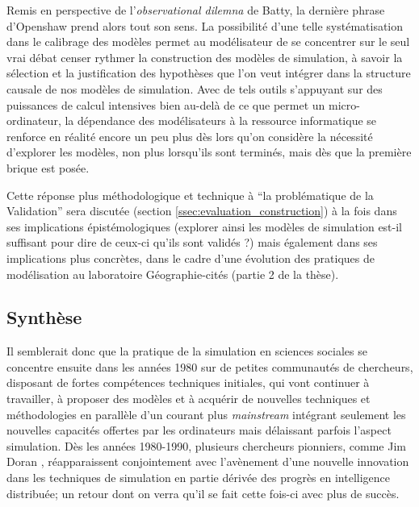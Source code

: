 Remis en perspective de l'\textit{observational dilemna} de Batty, la dernière phrase d'Openshaw prend alors tout son sens. La possibilité d'une telle systématisation dans le calibrage des modèles permet au modélisateur de se concentrer sur le seul vrai débat censer rythmer la construction des modèles de simulation, à savoir la sélection et la justification des hypothèses que l'on veut intégrer dans la structure causale de nos modèles de simulation. Avec de tels outils s'appuyant sur des puissances de calcul intensives bien au-delà de ce que permet un micro-ordinateur, la dépendance des modélisateurs à la ressource informatique se renforce en réalité encore un peu plus dès lors qu'on considère la nécessité d'explorer les modèles, non plus lorsqu'ils sont terminés, mais dès que la première brique est posée.

Cette réponse plus méthodologique et technique à \enquote{la problématique de la Validation} sera discutée (section \ref{ssec:evaluation_construction}) à la fois dans ses implications épistémologiques (explorer ainsi les modèles de simulation est-il suffisant pour dire de ceux-ci qu'ils sont validés ?) mais également dans ses implications plus concrètes, dans le cadre d'une évolution des pratiques de modélisation au laboratoire Géographie-cités (partie 2 de la thèse).

\subsection{Synthèse}


Il semblerait donc que la pratique de la simulation en sciences sociales se concentre ensuite dans les années 1980 sur de petites communautés de chercheurs, disposant de fortes compétences techniques initiales, qui vont continuer à travailler, à proposer des modèles et à acquérir de nouvelles techniques et méthodologies en parallèle d'un courant plus \textit{mainstream} intégrant seulement les nouvelles capacités offertes par les ordinateurs mais délaissant parfois l'aspect simulation. Dès les années 1980-1990, plusieurs chercheurs pionniers, comme Jim Doran \autocites{Doran1982, Doran1985, Doran1986, Doran1986b}, réapparaissent conjointement avec l’avènement d'une nouvelle innovation dans les techniques de simulation en partie dérivée des progrès en intelligence distribuée; un retour dont on verra qu'il se fait cette fois-ci avec plus de succès.

